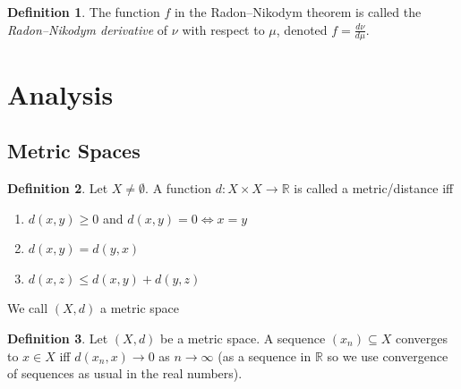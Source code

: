 \documentclass[11pt,a4paper]{article}
\theoremstyle{definition}
\newtheorem{definition}{Definition}[section]
\begin{document}
\begin{definition}
The function $f$ in the Radon--Nikodym theorem is called the \emph{Radon--Nikodym derivative} of $\nu$ with respect to $\mu$, denoted $f = \frac{d\nu}{d\mu}$.
\end{definition}

\newpage

\section{Analysis}
\subsection{Metric Spaces}
\begin{definition}
Let $X \ne \emptyset$. A function $d: X\times X \to \mathbb{R}$ is called a metric/distance iff \begin{enumerate}
        \item[(M1)] $d(x,y) \ge 0$ and $d(x,y) = 0 \iff x=y$
        \item [(M2)] $d(x,y) = d(y,x)$
        \item [(M3)] $d(x,z) \le d(x,y) + d(y,z)$
    \end{enumerate}
We call $(X,d)$ a metric space
\end{definition}

\begin{definition}
Let $(X,d)$ be a metric space. A sequence $(x_n) \subseteq X$ converges to $x \in X$ iff $d(x_n, x) \to 0$ as $n \to \infty$ (as a sequence in $\mathbb{R}$ so we use convergence of sequences as usual in the real numbers).
\end{definition}
\end{document}
